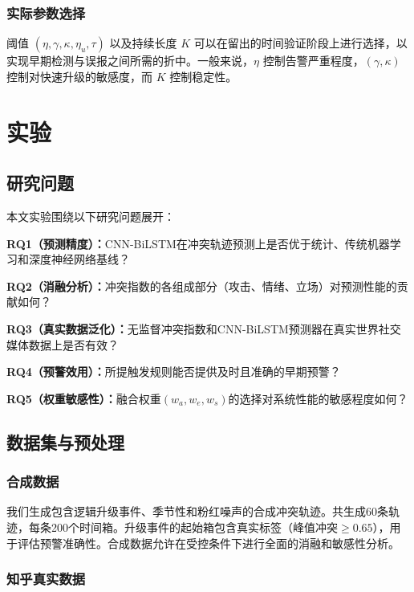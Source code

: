 \documentclass[conference]{IEEEtran}
\begin{document}
\subsubsection{实际参数选择}

阈值 $(\eta,\gamma,\kappa,\eta_u,\tau)$ 以及持续长度 $K$ 可以在留出的时间验证阶段上进行选择，以实现早期检测与误报之间所需的折中。一般来说，$\eta$ 控制告警严重程度，$(\gamma,\kappa)$ 控制对快速升级的敏感度，而 $K$ 控制稳定性。

\section{实验}

\subsection{研究问题}

本文实验围绕以下研究问题展开：

\noindent\textbf{RQ1（预测精度）：}CNN-BiLSTM在冲突轨迹预测上是否优于统计、传统机器学习和深度神经网络基线？

\noindent\textbf{RQ2（消融分析）：}冲突指数的各组成部分（攻击、情绪、立场）对预测性能的贡献如何？

\noindent\textbf{RQ3（真实数据泛化）：}无监督冲突指数和CNN-BiLSTM预测器在真实世界社交媒体数据上是否有效？

\noindent\textbf{RQ4（预警效用）：}所提触发规则能否提供及时且准确的早期预警？

\noindent\textbf{RQ5（权重敏感性）：}融合权重$(w_a,w_e,w_s)$的选择对系统性能的敏感程度如何？

\subsection{数据集与预处理}

\subsubsection{合成数据}

我们生成包含逻辑升级事件、季节性和粉红噪声的合成冲突轨迹。共生成60条轨迹，每条200个时间箱。升级事件的起始箱包含真实标签（峰值冲突$\ge 0.65$），用于评估预警准确性。合成数据允许在受控条件下进行全面的消融和敏感性分析。

\subsubsection{知乎真实数据}
\end{document}

